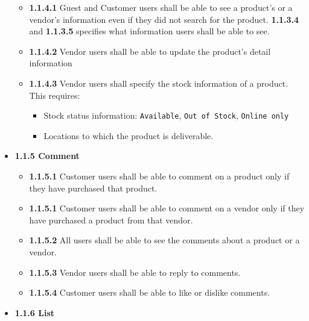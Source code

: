 \documentclass[]{article}
\providecommand{\tightlist}{%
  \setlength{\itemsep}{0pt}\setlength{\parskip}{0pt}}
\begin{document}
\begin{itemize}
          \begin{itemize}
              \item
                    \textbf{1.1.4.1} Guest and Customer users shall be able to see a
                    product's or a vendor's information even if they did not search for
                    the product. \textbf{1.1.3.4} and \textbf{1.1.3.5} specifies what
                    information users shall be able to see.
              \item
                    \textbf{1.1.4.2} Vendor users shall be able to update the product's
                    detail information
              \item
                    \textbf{1.1.4.3} Vendor users shall specify the stock information of
                    a product. This requires:

                    \begin{itemize}
                        \tightlist
                        \item
                              Stock status information: \texttt{Available},
                              \texttt{Out\ of\ Stock}, \texttt{Online\ only}
                        \item
                              Locations to which the product is deliverable.
                    \end{itemize}
          \end{itemize}
    \item
          \textbf{1.1.5 Comment}

          \begin{itemize}
              \tightlist
              \item
                    \textbf{1.1.5.1} Customer users shall be able to comment on a
                    product only if they have purchased that product.
              \item
                    \textbf{1.1.5.1} Customer users shall be able to comment on a vendor
                    only if they have purchased a product from that vendor.
              \item
                    \textbf{1.1.5.2} All users shall be able to see the comments about a
                    product or a vendor.
              \item
                    \textbf{1.1.5.3} Vendor users shall be able to reply to comments.
              \item
                    \textbf{1.1.5.4} Customer users shall be able to like or dislike
                    comments.
          \end{itemize}
    \item
          \textbf{1.1.6 List}


\end{itemize}
\end{document}

